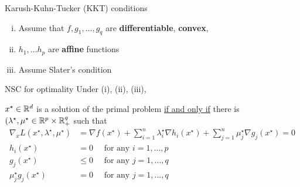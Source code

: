 \documentclass[xcolor={usenames,dvipsnames}]{beamer}
\begin{document}
\begin{frame}{Karush-Kuhn-Tucker (KKT) conditions}

  \begin{enumerate}[(i)]
    \item Assume that $f, g_1, \ldots, g_q$ are \textbf{differentiable}, \textbf{convex}, 
    \item $h_1,\hdots h_p$ are \textbf{affine} functions
    \item Assume Slater's condition
    \end{enumerate}
    \begin{block}{NSC for optimality}
    Under (i), (ii), (iii), 
    
    $x^\star \in \mathbb{R}^d$ is a solution of the primal problem \underline{if and only if} there is $(\lambda^\star, \mu^\star \in \mathbb{R}^p\times\mathbb{R}_+^q$ such that
    \begin{align*}
      \nabla_x L(x^\star, \lambda^\star, \mu^\star) &= \nabla f(x^\star) 
      + \sum_{i=1}^n \lambda_i^\star \nabla h_i(x^\star) 
      + \sum_{j=1}^n \mu_j^\star \nabla g_j(x^\star) = 0 \\
      h_i(x^\star) &= 0 \quad \text{ for any } i=1, \ldots, p \\
      g_j(x^\star) &\leq 0 \quad \text{ for any } j=1, \ldots, q \\
      \mu_j^\star g_j(x^\star) &= 0 \quad \text{ for any } j=1, \ldots, q \\
    \end{align*}
    \end{block}
\end{frame}
\end{document}
